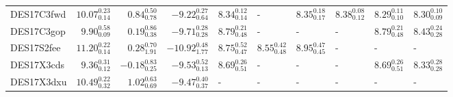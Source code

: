 \documentclass[fleqn,usenatbib,]{mnras}
\begin{document}
\begin{table}
\begin{threeparttable}
\begin{tabular}{lrrrllllll}
DES17C3fwd  &  $10.07 _{\scriptscriptstyle 0.14} ^{\scriptscriptstyle 0.23}$ &   $0.84 _{\scriptscriptstyle 0.78} ^{\scriptscriptstyle 0.50}$ &   $-9.22 _{\scriptscriptstyle 0.64} ^{\scriptscriptstyle 0.27}$ &  $8.34 _{\scriptscriptstyle 0.14} ^{\scriptscriptstyle 0.12}$ &                                                             - &  $8.35 _{\scriptscriptstyle 0.17} ^{\scriptscriptstyle 0.18}$ &  $8.38 _{\scriptscriptstyle 0.12} ^{\scriptscriptstyle 0.08}$ &  $8.29 _{\scriptscriptstyle 0.10} ^{\scriptscriptstyle 0.11}$ &  $8.30 _{\scriptscriptstyle 0.09} ^{\scriptscriptstyle 0.10}$ \\
DES17C3gop  &   $9.90 _{\scriptscriptstyle 0.09} ^{\scriptscriptstyle 0.58}$ &   $0.19 _{\scriptscriptstyle 0.38} ^{\scriptscriptstyle 0.86}$ &   $-9.71 _{\scriptscriptstyle 0.28} ^{\scriptscriptstyle 0.28}$ &  $8.79 _{\scriptscriptstyle 0.48} ^{\scriptscriptstyle 0.21}$ &                                                             - &                                                             - &                                                             - &  $8.79 _{\scriptscriptstyle 0.48} ^{\scriptscriptstyle 0.21}$ &  $8.43 _{\scriptscriptstyle 0.28} ^{\scriptscriptstyle 0.24}$ \\
DES17S2fee  &  $11.20 _{\scriptscriptstyle 0.14} ^{\scriptscriptstyle 0.22}$ &   $0.28 _{\scriptscriptstyle 1.91} ^{\scriptscriptstyle 0.70}$ &  $-10.92 _{\scriptscriptstyle 1.77} ^{\scriptscriptstyle 0.48}$ &  $8.75 _{\scriptscriptstyle 0.47} ^{\scriptscriptstyle 0.52}$ &  $8.55 _{\scriptscriptstyle 0.48} ^{\scriptscriptstyle 0.42}$ &  $8.95 _{\scriptscriptstyle 0.45} ^{\scriptscriptstyle 0.47}$ &                                                             - &                                                             - &                                                             - \\
DES17X3cds  &   $9.36 _{\scriptscriptstyle 0.12} ^{\scriptscriptstyle 0.31}$ &  $-0.18 _{\scriptscriptstyle 0.25} ^{\scriptscriptstyle 0.83}$ &   $-9.53 _{\scriptscriptstyle 0.13} ^{\scriptscriptstyle 0.52}$ &  $8.69 _{\scriptscriptstyle 0.51} ^{\scriptscriptstyle 0.26}$ &                                                             - &                                                             - &                                                             - &  $8.69 _{\scriptscriptstyle 0.51} ^{\scriptscriptstyle 0.26}$ &  $8.33 _{\scriptscriptstyle 0.28} ^{\scriptscriptstyle 0.28}$ \\
DES17X3dxu  &  $10.49 _{\scriptscriptstyle 0.32} ^{\scriptscriptstyle 0.22}$ &   $1.02 _{\scriptscriptstyle 0.69} ^{\scriptscriptstyle 0.63}$ &   $-9.47 _{\scriptscriptstyle 0.37} ^{\scriptscriptstyle 0.40}$ &                                                             - &                                                             - &                                                             - &                                                             - &                                                             - &                                                             - \\

\end{tabular}
\end{threeparttable}
\end{table}
\end{document}
